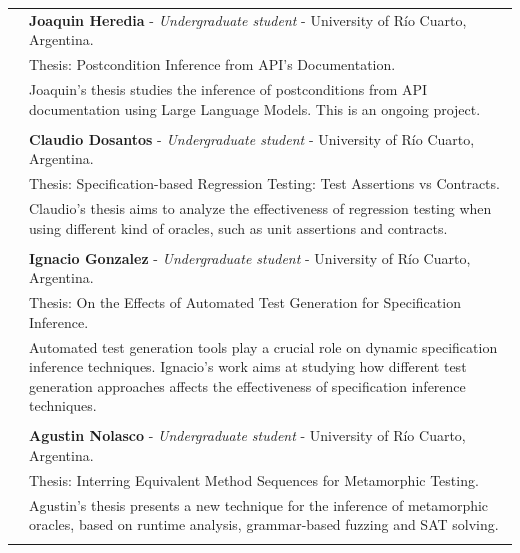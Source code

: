 \documentclass[a4paper,10pt]{article} %
\begin{document}
\begin{longtable}{>{\raggedleft\arraybackslash}p{} p{}}

2026 & \textbf{Joaquin Heredia} - \textit{Undergraduate student} - University of Río Cuarto, Argentina. \\
& Thesis: Postcondition Inference from API's Documentation. \\
& Joaquin's thesis studies the inference of postconditions from API documentation using Large Language Models.
This is an ongoing project. \\ & \\

2025 & \textbf{Claudio Dosantos} - \textit{Undergraduate student} - University of Río Cuarto, Argentina. \\
& Thesis: Specification-based Regression Testing: Test Assertions vs Contracts. \\
& Claudio's thesis aims to analyze the effectiveness of regression testing when using different kind of oracles, such as unit assertions and contracts. \\ & \\

2024 & \textbf{Ignacio Gonzalez} - \textit{Undergraduate student} - University of Río Cuarto, Argentina. \\
& Thesis: On the Effects of Automated Test Generation for Specification Inference. \\
& Automated test generation tools play a crucial role on dynamic specification inference techniques. Ignacio's work aims at studying how different test generation approaches affects the effectiveness of specification inference techniques. \\ & \\

2023 & \textbf{Agustin Nolasco} - \textit{Undergraduate student} - University of Río Cuarto, Argentina. \\ 
& Thesis: Interring Equivalent Method Sequences for Metamorphic Testing. \\
& Agustin's thesis presents a new technique for the inference of metamorphic oracles, based on runtime analysis, grammar-based fuzzing and SAT solving. \\ & \\

\end{longtable}
\end{document}
